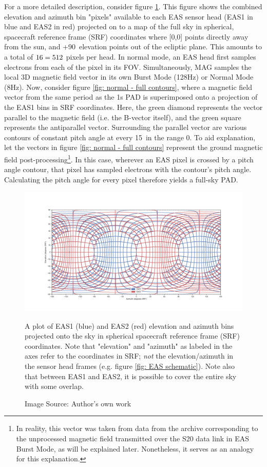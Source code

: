For a more detailed description, consider figure \ref{fig: all bins}. This figure shows the combined elevation and azimuth bin "pixels" available to each EAS sensor head (EAS1 in blue and EAS2 in red) projected on to a map of the full sky in spherical, spacecraft reference frame (SRF) coordinates where [0,0] points directly away from the sun, and +90\degree\ elevation points out of the ecliptic plane. This amounts to a total of \(16\time32=512\) pixels per head. In normal mode, an EAS head first samples electrons from each of the pixel in its FOV. Simultaneously, MAG samples the local 3D magnetic field vector in its own Burst Mode (128Hz) or Normal Mode (8Hz)\cite{horbury2020}. Now, consider figure \ref{fig: normal - full contours}, where a magnetic field vector from the same period as the 1s PAD is superimposed onto a projection of the EAS1 bins in SRF coordinates. Here, the green diamond represents the vector parallel to the magnetic field (i.e. the B-vector itself), and the green square represents the antiparallel vector. Surrounding the parallel vector are various contours of constant pitch angle at every 15\degree\ in the range 0\degree. To aid explanation, let the vectors in figure \ref{fig: normal - full contours} represent the ground magnetic field post-processing\footnote{In reality, this vector was taken from data from the archive corresponding to the unprocessed magnetic field transmitted over the S20 data link in EAS Burst Mode, as will be explained later. Nonetheless, it serves as an analogy for this explanation.}. In this case, wherever an EAS pixel is crossed by a pitch angle contour, that pixel has sampled electrons with the contour's pitch angle. Calculating the pitch angle for every pixel therefore yields a full-sky PAD.

\begin{figure}[h!]
    \centering
    \centerfloat
    \includegraphics[width=1.3\linewidth]{figures/all bins.png}
    \caption{A plot  of EAS1 (blue) and EAS2 (red) elevation and azimuth bins projected onto the sky in spherical spacecraft reference frame (SRF) coordinates. Note that "elevation" and "azimuth" as labeled in the axes refer to the coordinates in SRF; \textit{not} the elevation/azimuth in the sensor head frames (e.g. figure \ref{fig: EAS schematic}). Note also that between EAS1 and EAS2, it is possible to cover the entire sky with some overlap.}
    \caption*{Image Source: Author's own work}
    \label{fig: all bins}
\end{figure}


